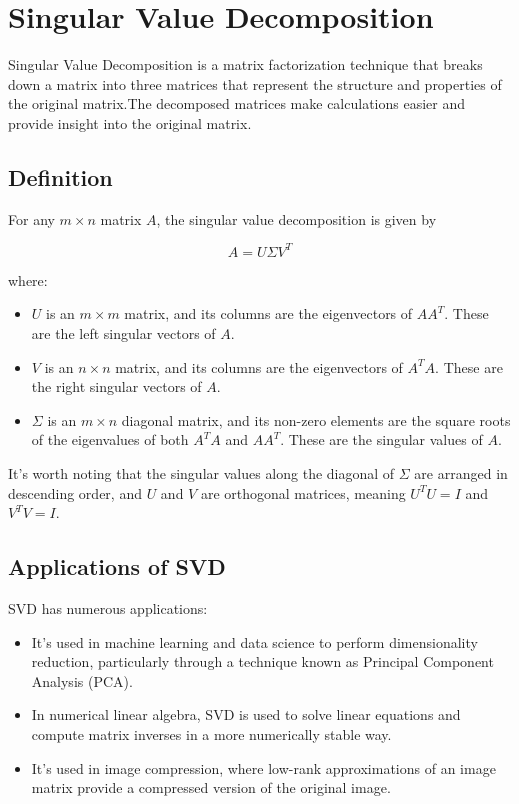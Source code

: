 \chapter{Singular Value Decomposition}

Singular Value Decomposition is a matrix factorization technique that breaks down a matrix into three matrices that represent the structure and properties of the original matrix.The decomposed matrices make calculations easier and provide insight into the original matrix. 
 

\section{Definition}

For any $m \times n$ matrix $A$, the singular value decomposition is
given by

\begin{equation}
A = U \Sigma V^T
\end{equation}

where:

\begin{itemize}
\item $U$ is an $m \times m$ matrix, and its columns are the
  eigenvectors of $AA^T$. These are the left singular vectors of $A$.

\item $V$ is an $n \times n$ matrix, and its columns are the
  eigenvectors of $A^TA$. These are the right singular vectors of $A$.

\item $\Sigma$ is an $m \times n$ diagonal matrix, and its non-zero
  elements are the square roots of the eigenvalues of both $A^TA$ and
  $AA^T$. These are the singular values of $A$.
\end{itemize}

It's worth noting that the singular values along the diagonal of
$\Sigma$ are arranged in descending order, and $U$ and $V$ are
orthogonal matrices, meaning $U^TU = I$ and $V^TV = I$.

\section{Applications of SVD}

SVD has numerous applications:

\begin{itemize}
\item It's used in machine learning and data science to perform
  dimensionality reduction, particularly through a technique known as
  Principal Component Analysis (PCA).

\item In numerical linear algebra, SVD is used to solve linear
  equations and compute matrix inverses in a more numerically stable
  way.

\item It's used in image compression, where low-rank approximations of
  an image matrix provide a compressed version of the original image.
\end{itemize}

